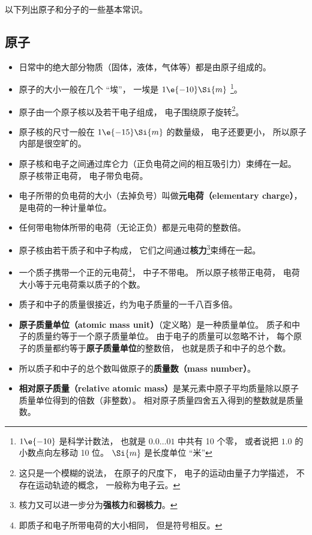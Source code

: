 
\begin{issues}
\issueDraft
\end{issues}


以下列出原子和分子的一些基本常识。

\subsection{原子}
\begin{itemize}
\item 日常中的绝大部分物质（固体，液体，气体等）都是由原子组成的。
\item 原子的大小一般在几个 “埃”， 一埃是 $1\e{-10}\Si{m}$ \footnote{$1\e{-10}$ 是科学计数法， 也就是 $0.0\dots01$ 中共有 10 个零， 或者说把 $1.0$ 的小数点向左移动 10 位。 $\Si{m}$ 是长度单位 “米”}。 %
\item 原子由一个原子核以及若干电子组成， 电子围绕原子旋转\footnote{这只是一个模糊的说法， 在原子的尺度下， 电子的运动由量子力学描述， 不存在运动轨迹的概念， 一般称为电子云。}。
\item 原子核的尺寸一般在 $1\e{-15}\Si{m}$ 的数量级， 电子还要更小， 所以原子内部是很空旷的。
\item 原子核和电子之间通过库仑力（正负电荷之间的相互吸引力）束缚在一起。 原子核带正电荷， 电子带负电荷。 %
\item 电子所带的负电荷的大小（去掉负号）叫做\textbf{元电荷（elementary charge）}， 是电荷的一种计量单位。 \item 任何带电物体所带的电荷（无论正负）都是元电荷的整数倍。
\item 原子核由若干质子和中子构成， 它们之间通过\textbf{核力}\footnote{核力又可以进一步分为\textbf{强核力}和\textbf{弱核力}。}束缚在一起。
\item 一个质子携带一个正的元电荷\footnote{即质子和电子所带电荷的大小相同， 但是符号相反。}， 中子不带电。 所以原子核带正电荷， 电荷大小等于元电荷乘以质子的个数。
\item 质子和中子的质量很接近，约为电子质量的一千八百多倍。
\item \textbf{原子质量单位（atomic mass unit）}（定义略）是一种质量单位。 质子和中子的质量约等于一个原子质量单位。 由于电子的质量可以忽略不计， 每个原子的质量都约等于\textbf{原子质量单位}的整数倍， 也就是质子和中子的总个数。
\item 所以质子和中子的总个数叫做原子的\textbf{质量数（mass number）}。
\item \textbf{相对原子质量（relative atomic mass）}是某元素中原子平均质量除以原子质量单位得到的倍数（非整数）。 相对原子质量四舍五入得到的整数就是质量数。

\end{itemize}
